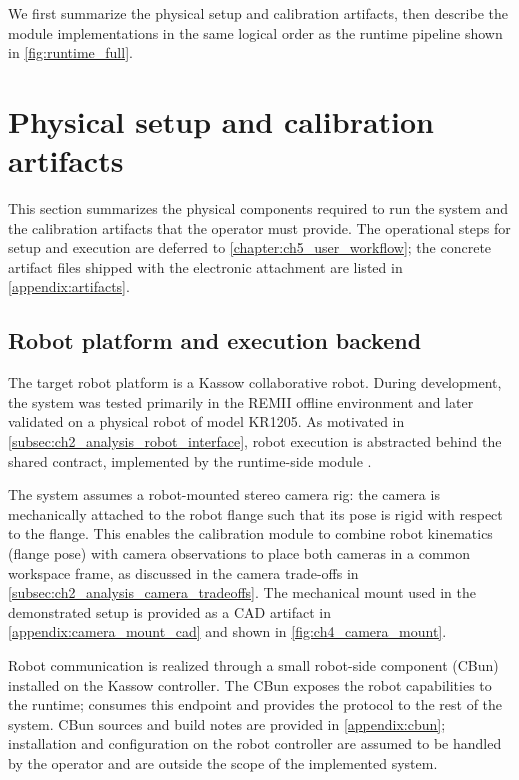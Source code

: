 We first summarize the physical setup and calibration artifacts, then describe the module implementations in the same logical order as the runtime pipeline shown in \autoref{fig:runtime_full}.

\section{Physical setup and calibration artifacts}
\label{sec:ch4_physical_setup}

This section summarizes the physical components required to run the system and the calibration artifacts that the operator must provide.
The operational steps for setup and execution are deferred to \autoref{chapter:ch5_user_workflow}; the concrete artifact files shipped with the electronic attachment are listed in \autoref{appendix:artifacts}.

\subsection{Robot platform and execution backend}
\label{subsec:ch4_hw_robot}

The target robot platform is a Kassow collaborative robot.
During development, the system was tested primarily in the REMII offline environment \cite{kassow_remii} and later validated on a physical robot of model KR1205.
As motivated in \autoref{subsec:ch2_analysis_robot_interface}, robot execution is abstracted behind the shared  contract, implemented by the runtime-side module .

The system assumes a robot-mounted stereo camera rig: the camera is mechanically attached to the robot flange such that its pose is rigid with respect to the flange.
This enables the calibration module to combine robot kinematics (flange pose) with camera observations to place both cameras in a common workspace frame, as discussed in the camera trade-offs in \autoref{subsec:ch2_analysis_camera_tradeoffs}.
The mechanical mount used in the demonstrated setup is provided as a CAD artifact in \autoref{appendix:camera_mount_cad} and shown in \autoref{fig:ch4_camera_mount}.

Robot communication is realized through a small robot-side component (CBun) installed on the Kassow controller.
The CBun exposes the robot capabilities to the runtime;  consumes this endpoint and provides the  protocol to the rest of the system.
CBun sources and build notes are provided in \autoref{appendix:cbun}; installation and configuration on the robot controller are assumed to be handled by the operator and are outside the scope of the implemented system.

